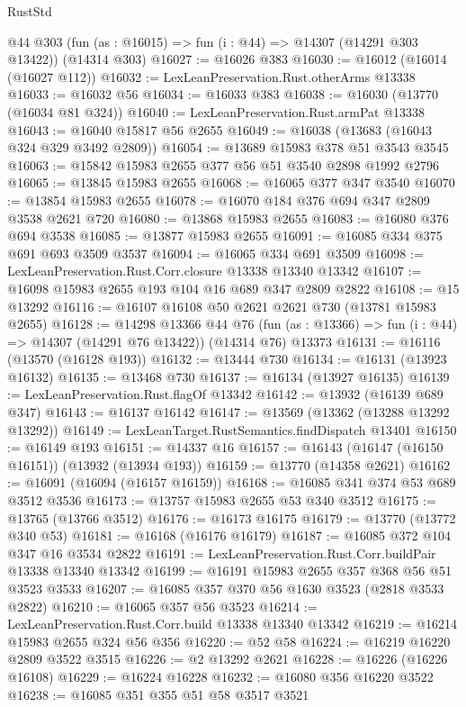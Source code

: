 \begin{lexlean}{RustStd}
\begin{coremodule}
    @44
    @303
    (fun (as : @16015) => fun (i : @44) => @14307 (@14291 @303 @13422))
    (@14314 @303)
@16027 := @16026 @383
@16030 := @16012 (@16014 (@16027 @112))
@16032 := LexLeanPreservation.Rust.otherArms @13338
@16033 := @16032 @56
@16034 := @16033 @383
@16038 := @16030 (@13770 (@16034 @81 @324))
@16040 := LexLeanPreservation.Rust.armPat @13338
@16043 := @16040 @15817 @56 @2655
@16049 := @16038 (@13683 (@16043 @324 @329 @3492 @2809))
@16054 := @13689 @15983 @378 @51 @3543 @3545
@16063 := @15842 @15983 @2655 @377 @56 @51 @3540 @2898 @1992 @2796
@16065 := @13845 @15983 @2655
@16068 := @16065 @377 @347 @3540
@16070 := @13854 @15983 @2655
@16078 := @16070 @184 @376 @694 @347 @2809 @3538 @2621 @720
@16080 := @13868 @15983 @2655
@16083 := @16080 @376 @694 @3538
@16085 := @13877 @15983 @2655
@16091 := @16085 @334 @375 @691 @693 @3509 @3537
@16094 := @16065 @334 @691 @3509
@16098 := LexLeanPreservation.Rust.Corr.closure @13338 @13340 @13342
@16107 := @16098 @15983 @2655 @193 @104 @16 @689 @347 @2809 @2822
@16108 := @15 @13292
@16116 := @16107 @16108 @50 @2621 @2621 @730 (@13781 @15983 @2655)
@16128 := @14298
    @13366
    @44
    @76
    (fun (as : @13366) => fun (i : @44) => @14307 (@14291 @76 @13422))
    (@14314 @76)
    @13373
@16131 := @16116 (@13570 (@16128 @193))
@16132 := @13444 @730
@16134 := @16131 (@13923 @16132)
@16135 := @13468 @730
@16137 := @16134 (@13927 @16135)
@16139 := LexLeanPreservation.Rust.flagOf @13342
@16142 := @13932 (@16139 @689 @347)
@16143 := @16137 @16142
@16147 := @13569 (@13362 (@13288 @13292 @13292))
@16149 := LexLeanTarget.RustSemantics.findDispatch @13401
@16150 := @16149 @193
@16151 := @14337 @16
@16157 := @16143 (@16147 (@16150 @16151)) (@13932 (@13934 @193))
@16159 := @13770 (@14358 @2621)
@16162 := @16091 (@16094 (@16157 @16159))
@16168 := @16085 @341 @374 @53 @689 @3512 @3536
@16173 := @13757 @15983 @2655 @53 @340 @3512
@16175 := @13765 (@13766 @3512)
@16176 := @16173 @16175
@16179 := @13770 (@13772 @340 @53)
@16181 := @16168 (@16176 @16179)
@16187 := @16085 @372 @104 @347 @16 @3534 @2822
@16191 := LexLeanPreservation.Rust.Corr.buildPair @13338 @13340 @13342
@16199 := @16191 @15983 @2655 @357 @368 @56 @51 @3523 @3533
@16207 := @16085 @357 @370 @56 @1630 @3523 (@2818 @3533 @2822)
@16210 := @16065 @357 @56 @3523
@16214 := LexLeanPreservation.Rust.Corr.build @13338 @13340 @13342
@16219 := @16214 @15983 @2655 @324 @56 @356
@16220 := @52 @58
@16224 := @16219 @16220 @2809 @3522 @3515
@16226 := @2 @13292 @2621
@16228 := @16226 (@16226 @16108)
@16229 := @16224 @16228
@16232 := @16080 @356 @16220 @3522
@16238 := @16085 @351 @355 @51 @58 @3517 @3521

\end{coremodule}
\end{lexlean}
